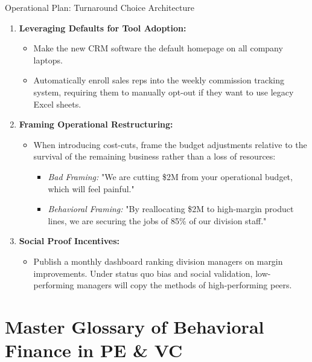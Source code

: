 \documentclass[11pt,a4paper]{article}
\begin{document}
\begin{pevcbox}{Operational Plan: Turnaround Choice Architecture}
\begin{enumerate}
    \item \textbf{Leveraging Defaults for Tool Adoption:}
    \begin{itemize}
        \item Make the new CRM software the default homepage on all company laptops.
        \item Automatically enroll sales reps into the weekly commission tracking system, requiring them to manually opt-out if they want to use legacy Excel sheets.
    \end{itemize}
    \item \textbf{Framing Operational Restructuring:}
    \begin{itemize}
        \item When introducing cost-cuts, frame the budget adjustments relative to the survival of the remaining business rather than a loss of resources:
        \begin{itemize}
            \item \textit{Bad Framing:} "We are cutting \$2M from your operational budget, which will feel painful."
            \item \textit{Behavioral Framing:} "By reallocating \$2M to high-margin product lines, we are securing the jobs of 85\% of our division staff."
        \end{itemize}
    \end{itemize}
    \item \textbf{Social Proof Incentives:}
    \begin{itemize}
        \item Publish a monthly dashboard ranking division managers on margin improvements. Under status quo bias and social validation, low-performing managers will copy the methods of high-performing peers.
    \end{itemize}
\end{enumerate}
\end{pevcbox}

\newpage
\section{Master Glossary of Behavioral Finance in PE \& VC}
\end{document}
